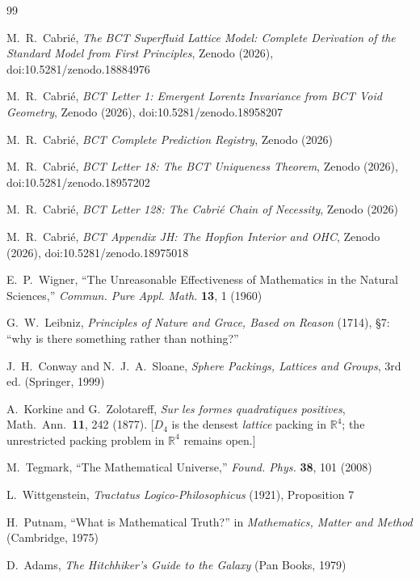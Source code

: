 \documentclass[aps,prl,twocolumn,superscriptaddress,floatfix]{revtex4-2}
\begin{document}
\begin{thebibliography}{99}

M.~R.~Cabri\'e, \textit{The BCT Superfluid Lattice Model: Complete 
Derivation of the Standard Model from First Principles},
Zenodo (2026), doi:10.5281/zenodo.18884976

M.~R.~Cabri\'e, \textit{BCT Letter 1: Emergent Lorentz Invariance 
from BCT Void Geometry}, Zenodo (2026), doi:10.5281/zenodo.18958207

M.~R.~Cabri\'e, \textit{BCT Complete Prediction Registry},
Zenodo (2026)

M.~R.~Cabri\'e, \textit{BCT Letter 18: The BCT Uniqueness Theorem},
Zenodo (2026), doi:10.5281/zenodo.18957202

M.~R.~Cabri\'e, \textit{BCT Letter 128: The Cabri\'e Chain of 
Necessity}, Zenodo (2026)

M.~R.~Cabri\'e, \textit{BCT Appendix JH: The Hopfion Interior 
and OHC}, Zenodo (2026), doi:10.5281/zenodo.18975018

E.~P.~Wigner, ``The Unreasonable Effectiveness of Mathematics 
in the Natural Sciences,''
\textit{Commun. Pure Appl. Math.} \textbf{13}, 1 (1960)

G.~W.~Leibniz, \textit{Principles of Nature and Grace, Based 
on Reason} (1714), \S7: ``why is there something rather than nothing?''

J.~H.~Conway and N.~J.~A.~Sloane, \textit{Sphere Packings, 
Lattices and Groups}, 3rd ed. (Springer, 1999)

A.~Korkine and G.~Zolotareff,
\textit{Sur les formes quadratiques positives},
Math.\ Ann.\ \textbf{11}, 242 (1877).
[$D_4$ is the densest \emph{lattice} packing in $\mathbb{R}^4$;
the unrestricted packing problem in $\mathbb{R}^4$ remains open.]


M.~Tegmark, ``The Mathematical Universe,''
\textit{Found. Phys.} \textbf{38}, 101 (2008)

L.~Wittgenstein, \textit{Tractatus Logico-Philosophicus} (1921),
Proposition 7

H.~Putnam, ``What is Mathematical Truth?''
in \textit{Mathematics, Matter and Method} (Cambridge, 1975)

D.~Adams, \textit{The Hitchhiker's Guide to the Galaxy}
(Pan Books, 1979)

\end{thebibliography}
\end{document}

